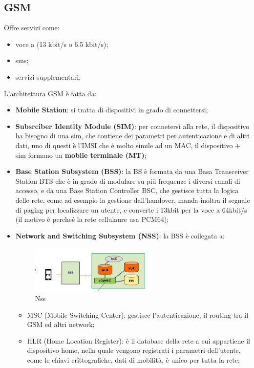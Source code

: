 \documentclass[12pt]{article}
\begin{document}
\subsection{GSM}
Offre servizi come:
\begin{itemize}
    \item voce a (13 kbit/s o 6.5 kbit/s);
    \item sms;
    \item servizi supplementari;
\end{itemize}
L'architettura GSM \`e fatta da:
\begin{itemize}
    \item \textbf{Mobile Station}: si tratta di dispositivi in grado di connettersi;
    \item \textbf{Subsrciber Identity Module (SIM)}: per connetersi alla rete, il dispositivo ha bisogno di una sim, che contiene dei parametri per autenticazione e di altri dati, uno di questi \`e l'IMSI che \`e molto simile ad un MAC, il dispositivo + sim formano un \textbf{mobile terminale (MT)};
    \item \textbf{Base Station Subsystem (BSS)}: la BS \`e formata da una Basa Transceiver Station BTS che \`e in grado di modulare su pi\`u frequenze i diversi canali di accesso, e da una Base Station Controller BSC, che gestisce tutta la logica delle rete, come ad esempio la gestione dall'handover, manda inoltra il segnale di paging per localizzare un utente, e converte i 13kbit per la voce a 64kbit/s (il motivo \`e perche\'e la rete cellulaure usa PCM64);
    \item \textbf{Network and Switching Subsystem (NSS)}: la BSS \`e collegata a:
        \begin{figure}[H]
            \centering
            \includegraphics[width=0.6\textwidth]{nss.png}
            \caption{Nss}
            \label{fig:nss}
        \end{figure}
        \begin{itemize}
            \item MSC (Mobile Switching Center): gestisce l'autenticazione, il routing tra il GSM ed altri network;
            \item HLR (Home Location Register): \`e il database della rete a cui appartiene il dispositivo home, nella quale vengono registrati i parametri dell'utente, come le chiavi crittografiche, dati di mobilit\`a, \`e unico per tutta la rete;

\end{itemize}
\end{itemize}
\end{document}
